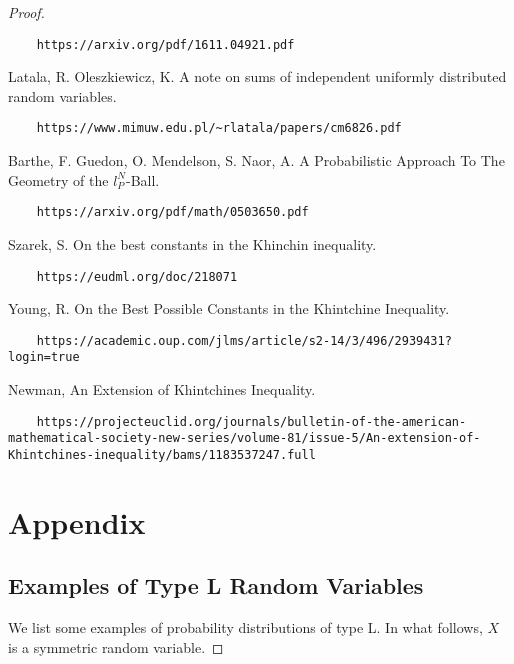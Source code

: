 \documentclass[10pt]{article}
\newcommand{\1}{\textbf{1}}
\theoremstyle{remark}
\theoremstyle{definition}
\begin{document}
\begin{proof}
\begin{thebibliography}{9}
\begin{verbatim}
	https://arxiv.org/pdf/1611.04921.pdf
\end{verbatim}

 Latala, R. Oleszkiewicz, K. A note on sums of independent uniformly distributed random variables.

\begin{verbatim}
	https://www.mimuw.edu.pl/~rlatala/papers/cm6826.pdf
\end{verbatim}

 Barthe, F. Guedon, O. Mendelson, S. Naor, A. A Probabilistic Approach To The Geometry of the $l_P^N$-Ball.

\begin{verbatim}
	https://arxiv.org/pdf/math/0503650.pdf
\end{verbatim}

 Szarek, S. On the best constants in the Khinchin inequality.

\begin{verbatim}
	https://eudml.org/doc/218071
\end{verbatim}

 Young, R. On the Best Possible Constants in the Khintchine Inequality.

\begin{verbatim}
	https://academic.oup.com/jlms/article/s2-14/3/496/2939431?login=true
\end{verbatim}

 Newman, An Extension of Khintchines Inequality. 

\begin{verbatim}
	https://projecteuclid.org/journals/bulletin-of-the-american-mathematical-society-new-series/volume-81/issue-5/An-extension-of-Khintchines-inequality/bams/1183537247.full
\end{verbatim}

\end{thebibliography}

\section{Appendix}

\subsection{Examples of Type L Random Variables}

We list some examples of probability distributions of type L. In what follows, $X$ is a symmetric random variable.


\end{proof}
\end{document}
